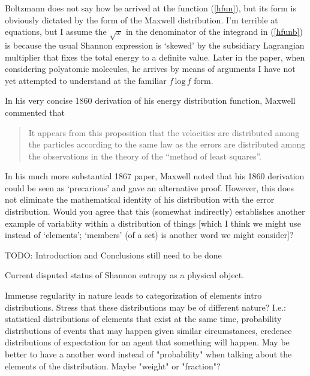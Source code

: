 \documentclass{article}
\begin{document}
Boltzmann does not say how he arrived at the function (\ref{hfun}), but its form is obviously dictated by the form of the Maxwell distribution. I'm terrible at equations, but I assume the $\sqrt x$ in the denominator of the integrand in (\ref{hfunb}) is because the usual Shannon expression is `skewed' by the subsidiary Lagrangian multiplier that fixes the total energy to a definite value. Later in the paper, when considering polyatomic molecules, he arrives by means of arguments I have not yet attempted to understand at the familiar $f\, \textrm{log}\,f$ form.

In his very concise 1860 derivation of his energy distribution function, Maxwell commented that

\begin{quote}\small

It appears from this proposition that the velocities are distributed among the particles according  to the same law as the errors are distributed among the observations in the theory of the ``method of least squares''.

\end{quote}\normalsize

In his much more substantial 1867 paper, Maxwell noted that his 1860 derivation could be seen as `precarious' and gave an alternative proof. However, this does not eliminate the mathematical identity of his distribution with the error distribution. Would you agree that this (somewhat indirectly) establishes another example of variablity within a distribution of things [which I think we might use instead of `elements'; `members' (of a set) is another word we might consider]?





\vspace{2in}

TODO: Introduction and Conclusions still need to be done

Current disputed status of Shannon entropy as a physical object.

Immense regularity in nature leads to categorization of elements intro distributions. Stress that these distributions may be of different nature? I.e.: statistical distributions of elements that exist at the same time, probability distributions of events that may happen given similar circumstances, credence distributions of expectation for an agent that something will happen. May be better to have a another word instead of "probability" when talking about the elements of the distribution. Maybe "weight" or "fraction"?
\end{document}
